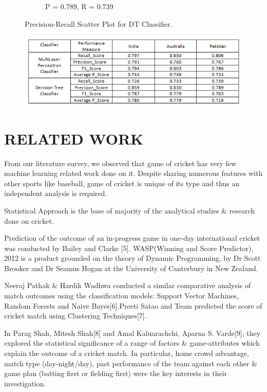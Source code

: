 \documentclass[a4paper, 10pt, conference]{IEEEtran}
\begin{document}
\begin{figure}[h!]
\begin{subfigure}[b]{0.4\linewidth}
    \caption{P = 0.789, R = 0.739}
  \end{subfigure}
  \caption{Precision-Recall Scatter Plot for DT Classifier.}
  \label{fig:dtclfPlots}
\end{figure}

\begin{figure}[h!]
  \includegraphics[width=\linewidth]{TeamScore.png}
  \label{fig:results}
\end{figure}


\section{RELATED WORK}
From our literature survey, we observed that game of cricket has very few machine learning related work done on it. Despite sharing numerous features with other sports like baseball, game of cricket is unique of its type and thus an independent analysis is required.

Statistical Approach is the base of majority of the analytical studies \& research done on cricket.

Prediction of the outcome of an in-progress game in one-day international cricket was conducted by Bailey and Clarke [5]. WASP(Winning and Score Predictor), 2012 is a product grounded on the theory of Dynamic Programming, by Dr Scott Brooker and Dr Seamus Hogan at the University of Canterbury in New Zealand.

Neeraj Pathak \& Hardik Wadhwa conducted a similar comparative analysis of match outcomes using the classification models: Support Vector Machines, Random Forests and Naive Bayes[6].Preeti Satao and Team predicted the score of cricket match using Clustering Techniques[7].

In Parag Shah, Mitesh Shah[8] and Amal Kaluarachchi, Aparna S. Varde[9], they explored the statistical significance of a range of factors \& game-attributes which explain the outcome of a cricket match. In particular, home crowd advantage, match type (day-night/day), past performance of the team against each other \& game plan (batting first or fielding first) were the key interests in their investigation.
\end{document}
